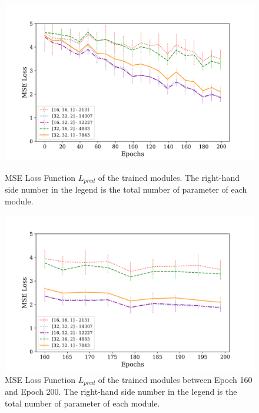         \begin{figure}[hbtp]
                \centering
                \includegraphics[width=15cm, keepaspectratio]{images/results/module_parametertuning_1.png}
                \caption{MSE Loss Function $L_{pred}$ of the trained modules. The right-hand side number in the legend is the total number of parameter of each module.}
                \label{fig:results_parametertuning_1}
                
                \vspace{1.5cm}
                
                \includegraphics[width=15cm, keepaspectratio]{images/results/module_parametertuning_2.png}
                \caption{MSE Loss Function $L_{pred}$ of the trained modules between Epoch 160 and Epoch 200. The right-hand side number in the legend is the total number of parameter of each module.}
                \label{fig:results_parametertuning_2}
        \end{figure}
        

